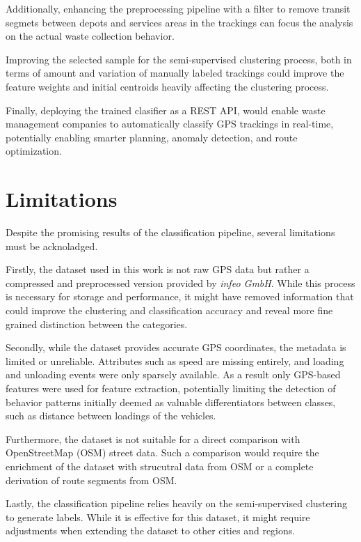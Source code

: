 \documentclass[a4paper,12pt,twoside]{scrreprt}
\begin{document}
Additionally, enhancing the preprocessing pipeline with a filter to remove
transit segmets between depots and services areas in the trackings can focus
the
analysis on the actual waste collection behavior.

Improving the selected sample for the semi-supervised clustering process, both
in terms of amount and variation of manually labeled trackings
could improve the feature weights and initial centroids heavily affecting the
clustering process.

Finally, deploying the trained clasifier as a REST API, would enable
waste management companies to automatically classify GPS trackings in
real-time,
potentially enabling smarter planning, anomaly detection, and route
optimization.

\section{Limitations}

Despite the promising results of the classification pipeline, several
limitations must be acknoladged.

Firstly, the dataset used in this work is not raw GPS data but rather a
compressed and preprocessed version provided by \textit{infeo GmbH}.
While this process is necessary for storage and performance, it might have
removed information that could improve the clustering and classification
accuracy and reveal more fine grained distinction between the categories.

Secondly, while the dataset provides accurate GPS coordinates, the metadata is
limited or unreliable. Attributes such as speed are missing entirely, and
loading and
unloading events were only sparsely available. As a result only GPS-based
features
were used for feature extraction, potentially limiting the detection of
behavior patterns
initially deemed as valuable differentiators between classes, such as distance
between loadings of the vehicles.

Furthermore, the dataset is not suitable for a direct comparison with
OpenStreetMap (OSM) street data. Such a comparison would require the enrichment
of the dataset with strucutral data from OSM or a complete derivation of route
segments from OSM.

Lastly, the classification pipeline relies heavily on the semi-supervised
clustering
to generate labels. While it is effective for this dataset, it might require
adjustments
when extending the dataset to other cities and regions.
\end{document}
